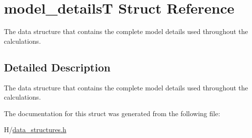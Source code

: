\hypertarget{structmodel__detailsT}{
\section{model\_\-detailsT Struct Reference}
\label{structmodel__detailsT}
}


The data structure that contains the complete model details used throughout the calculations.  




\subsection{Detailed Description}
The data structure that contains the complete model details used throughout the calculations. 

The documentation for this struct was generated from the following file:\begin{DoxyCompactItemize}
\item 
H/\hyperlink{data__structures_8h}{data\_\-structures.h}\end{DoxyCompactItemize}
